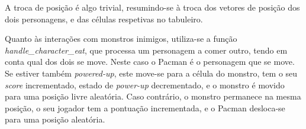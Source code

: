 \documentclass[a4paper]{report}
\begin{document}
            \par A troca de posição é algo trivial, resumindo-se à troca dos vetores de posição dos dois personagens, e das células respetivas no tabuleiro.
            \par Quanto às interações com monstros inimigos, utiliza-se a função \textit{handle\_character\_eat}, que processa um personagem a comer outro, tendo em conta qual dos dois se move. Neste caso o Pacman é o personagem que se move. Se estiver também \textit{powered-up}, este move-se para a célula do monstro, tem o seu \textit{score} incrementado, estado de \textit{power-up} decrementado, e o monstro é movido para uma posição livre aleatória. Caso contrário, o monstro permanece na mesma posição, o seu jogador tem a pontuação incrementada, e o Pacman desloca-se para uma posição aleatória.
\end{document}
